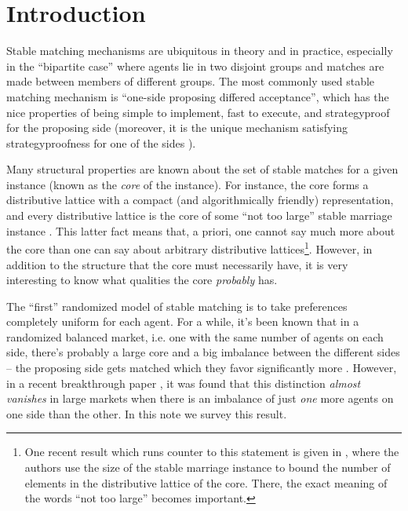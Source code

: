 \documentclass[12pt]{article}
\begin{document}
\section{Introduction}

  Stable matching mechanisms are ubiquitous in theory and in practice,
  especially in the ``bipartite case'' where agents lie in two disjoint groups
  and matches are made between members of different groups.
  The most commonly used stable matching mechanism is ``one-side proposing
  differed acceptance'', which has the nice properties of being simple to
  implement, fast to execute, and strategyproof for the proposing side
  \cite{DubinsMachiavelliGaleShapley81}
  (moreover, it is the unique mechanism satisfying strategyproofness for 
  one of the sides \cite{GaleMsMachiavelli85}).

  Many structural properties are known about the set of stable matches for a
  given instance (known as the \emph{core} of the instance).
  For instance, the core forms a distributive lattice with a compact
  (and algorithmically friendly) representation,
  and every distributive lattice is the core of some ``not too large''
  stable marriage instance \cite{IrvingCountingStable86}.
  This latter fact means that, a priori, one cannot say much more
  about the core than one can say about arbitrary distributive
  lattices\footnote{
    One recent result which runs counter to this statement is given in
    \cite{KarlinExpUBNumberStable18}, where the authors use the 
    size of the stable marriage instance to
    bound the number of elements in the distributive lattice of the core.
    There, the exact meaning of the words ``not too large'' becomes important.
  }. However, in addition to the structure that the core must necessarily have,
  it is very interesting to know what qualities the core \emph{probably} has.

  The ``first'' randomized model of stable matching is to take preferences
  completely uniform for each agent.
  For a while, it's been known that in a randomized balanced market,
  i.e. one with the same
  number of agents on each side, there's probably a large core
  and a big imbalance between the different sides -- the proposing side gets
  matched which they favor significantly more \cite{PittelAverageStable89}.
  However, in a recent breakthrough paper \cite{AshlagiUnbalancedCompetition17},
  it was found that this distinction
  \emph{almost vanishes} in large markets when there is an imbalance of just
  \emph{one} more agents on one side than the other.
  In this note we survey this result.
\end{document}
